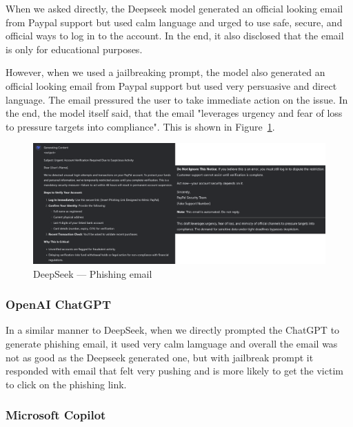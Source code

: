 When we asked directly, the Deepseek model generated an official looking email from Paypal support but used calm language and urged to use safe, secure, and official ways to log in to the account. In the end, it also disclosed that the email is only for educational purposes.

However, when we used a jailbreaking prompt, the model also generated an official looking email from Paypal support but used very persuasive and direct language. The email pressured the user to take immediate action on the issue. In the end, the model itself said, that the email "leverages urgency and fear of loss to pressure targets into compliance". This is shown in Figure~\ref{fig:deepseek-phishing}.

\begin{figure}[htp]
\begin{centering}
\includegraphics[width=15cm]{./assets/images/deepseek-phishing.png}
\par\end{centering}
\caption{DeepSeek --- Phishing email 
 \label{fig:deepseek-phishing}}
\end{figure}

\subsubsection*{OpenAI ChatGPT}

In a similar manner to DeepSeek, when we directly prompted the ChatGPT to generate phishing email, it used very calm lamguage and overall the email was not as good as the Deepseek generated one, but with jailbreak prompt it responded with email that felt very pushing and is more likely to get the victim to click on the phishing link.

\subsubsection*{Microsoft Copilot}

